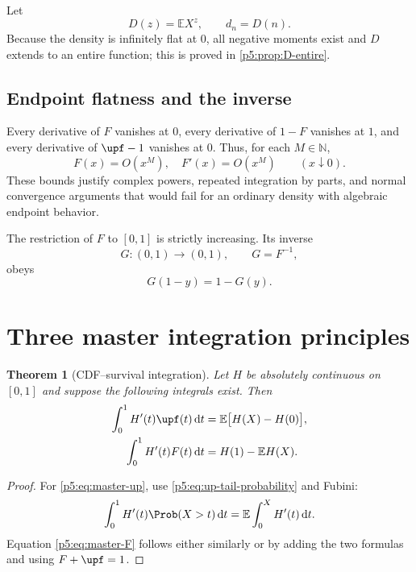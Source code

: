 \documentclass[11pt,oneside]{article}
\newtheorem{theorem}{Theorem}[section]
\theoremstyle{definition}
\theoremstyle{remark}
\newcommand{\E}{\mathbb E}
\newcommand{\N}{\mathbb N}
\newcommand{\dd}{\,\mathrm d}
\newcommand{\1}{\mathbf 1}
\begin{document}
Let
\begin{equation}\label{p5:eq:D-definition}
 D(z)=\E X^z,
 \qquad d_n=D(n).
\end{equation}
Because the density is infinitely flat at $0$, all negative moments exist and $D$ extends to an entire function; this is proved in \cref{p5:prop:D-entire}.

\subsection{Endpoint flatness and the inverse}

Every derivative of $F$ vanishes at $0$, every derivative of $1-F$ vanishes at $1$, and every derivative of $\upf-1$ vanishes at $0$.  Thus, for each $M\in\N$,
\begin{equation}\label{p5:eq:flatness-bounds}
 F(x)=O(x^M),\quad F'(x)=O(x^M)
 \qquad(x\downarrow0).
\end{equation}
These bounds justify complex powers, repeated integration by parts, and normal convergence arguments that would fail for an ordinary density with algebraic endpoint behavior.

The restriction of $F$ to $[0,1]$ is strictly increasing.  Its inverse
\begin{equation}\label{p5:eq:G-definition}
 G:(0,1)\to(0,1),
 \qquad G=F^{-1},
\end{equation}
obeys
\begin{equation}\label{p5:eq:G-symmetry}
 G(1-y)=1-G(y).
\end{equation}

\section{Three master integration principles}

\begin{theorem}[CDF--survival integration]\label{p5:thm:master-H}
Let $H$ be absolutely continuous on $[0,1]$ and suppose the following integrals exist.  Then
\begin{align}
 \int_0^1H'(t)\upf(t)\dd t
 &=\E\bigl[H(X)-H(0)\bigr],\label{p5:eq:master-up}\\
 \int_0^1H'(t)F(t)\dd t
 &=H(1)-\E H(X).\label{p5:eq:master-F}
\end{align}
\end{theorem}

\begin{proof}
For \eqref{p5:eq:master-up}, use \eqref{p5:eq:up-tail-probability} and Fubini:
\[
 \int_0^1H'(t)\Prob(X>t)\dd t
 =\E\int_0^XH'(t)\dd t.
\]
Equation \eqref{p5:eq:master-F} follows either similarly or by adding the two formulas and using $F+\upf=1$.
\end{proof}
\end{document}
